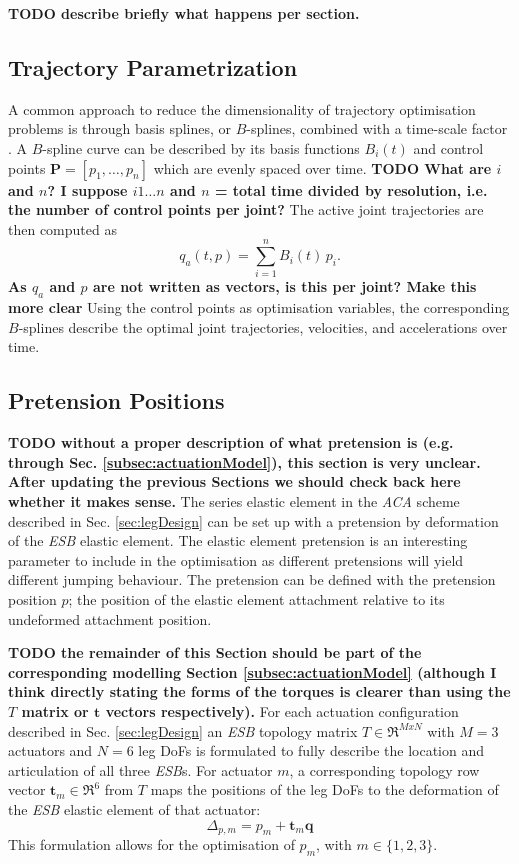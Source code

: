 \documentclass[letterpaper, 10 pt, conference]{ieeeconf}  %
\begin{document}
\textbf{TODO describe briefly what happens per section.}

\subsection{Trajectory Parametrization}
A common approach to reduce the dimensionality of trajectory optimisation problems is through basis splines, or $B$-splines, combined with a time-scale factor \cite{ude2000planning,babivc2009biarticulated,wang1999weight,albro2001optimal}. A $B$-spline curve can be described by its basis functions $B_i(t)$ and control points $\mathbf{P}=\left[p_1,\dots,p_n\right]$ which are evenly spaced over time. \textbf{TODO What are $i$ and $n$? I suppose $i 1 \dots n$ and $n$ = total time divided by resolution, i.e. the number of control points per joint?} The active joint trajectories are then computed as   
\begin{equation}
	q_a(t,p) = \sum_{i=1}^{n} B_i (t) \, p_i.
\end{equation}
\textbf{As $q_a$ and $p$ are not written as vectors, is this per joint? Make this more clear}
Using the control points as optimisation variables, the corresponding $B$-splines describe the optimal joint trajectories, velocities, and accelerations over time. 

\subsection{Pretension Positions}
\textbf{TODO without a proper description of what pretension is (e.g. through Sec. \ref{subsec:actuationModel}), this section is very unclear. After updating the previous Sections we should check back here whether it makes sense.}
The series elastic element in the \textit{ACA} scheme described in Sec. \ref{sec:legDesign} can be set up with a pretension by deformation of the \textit{ESB} elastic element. The elastic element pretension is an interesting parameter to include in the optimisation as different pretensions will yield different jumping behaviour. The pretension can be defined with the pretension position $p$; the position of the elastic element attachment relative to its undeformed attachment position.

\textbf{TODO the remainder of this Section should be part of the corresponding modelling Section \ref{subsec:actuationModel} (although I think directly stating the forms of the torques is clearer than using the $T$ matrix or $\mathbf{t}$ vectors respectively).} For each actuation configuration described in Sec. \ref{sec:legDesign} an \textit{ESB} topology matrix $T \in \mathfrak{R}^{M x N}$ with $M=3$ actuators and $N=6$ leg DoFs is formulated to fully describe the location and articulation of all three \textit{ESB}s. For actuator $m$, a corresponding topology row vector $\mathbf{t}_m \in \mathfrak{R}^6$ from $T$ maps the positions of the leg DoFs to the deformation of the \textit{ESB} elastic element of that actuator:
\begin{equation}
\Delta_{p,m} = p_m + \mathbf{t}_m \mathbf{q}
\end{equation}
This formulation allows for the optimisation of $p_m$, with $m \in \{1,2,3\}$.
\end{document}
